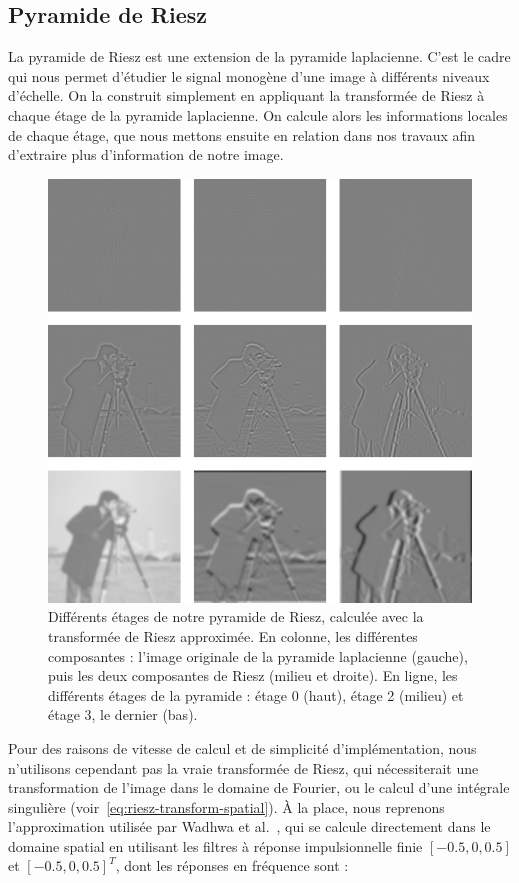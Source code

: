 \subsection{Pyramide de Riesz}

La pyramide de Riesz est une extension de la pyramide laplacienne. C'est le cadre qui nous permet d'étudier le signal monogène d'une image à différents niveaux d'échelle. On la construit simplement en appliquant la transformée de Riesz à chaque étage de la pyramide laplacienne. On calcule alors les informations locales de chaque étage, que nous mettons ensuite en relation dans nos travaux afin d'extraire plus d'information de notre image.

\begin{figure}
    \centering
    \includegraphics[width=.65\textwidth]{contenu/resources/images/riesz_pyramid_cameraman}
    \caption[Pyramide de Riesz]{Différents étages de notre pyramide de Riesz, calculée avec la transformée de Riesz approximée. En colonne, les différentes composantes : l'image originale de la pyramide laplacienne (gauche), puis les deux composantes de Riesz (milieu et droite). En ligne, les différents étages de la pyramide : étage 0 (haut), étage 2 (milieu) et étage 3, le dernier (bas).}
    \label{fig:riesz-pyramid-cameraman}
\end{figure}

Pour des raisons de vitesse de calcul et de simplicité d'implémentation, nous n'utilisons cependant pas la vraie transformée de Riesz, qui nécessiterait une transformation de l'image dans le domaine de Fourier, ou le calcul d'une intégrale singulière (voir~\ref{eq:riesz-transform-spatial}). À la place, nous reprenons l'approximation utilisée par Wadhwa et al.~\cite{wadhwa_riesz_2014}, qui se calcule directement dans le domaine spatial en utilisant les filtres à réponse impulsionnelle finie $[-0.5, 0, 0.5]$ et $[-0.5, 0, 0.5]^T$, dont les réponses en fréquence sont :

